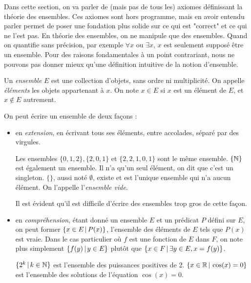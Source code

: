 Dans cette section, on va parler de (mais pas de tous les) axiomes définissant la théorie des ensembles. Ces axiomes sont hors programme, mais en avoir entendu parler permet de poser une fondation plus solide sur ce qui est "correct" et ce qui ne l'est pas. En théorie des ensembles, on ne manipule que des ensembles. Quand on quantifie sans précision, par exemple $\forall x$ ou $\exists x$, $x$ est seulement supposé être un ensemble.
Pour des raisons fondamentales à un point contrariant, nous ne pouvons pas donner mieux qu'une définition intuitive de la notion d'ensemble. 

\begin{dftn}
    Un \emph{ensemble} $E$ est une collection d'objets, sans ordre ni multiplicité. On  appelle \emph{éléments} les objets appartenant à $x$. On note $x \in E$ si $x$ est un élément de $E$, et $x \notin E$ autrement.
\end{dftn}


On peut écrire un ensemble de deux façons :
\begin{itemize}
    \item en \emph{extension}, en écrivant tous ses éléments, entre accolades, séparé par des virgules.
    \begin{lined}
        Les ensembles $\{0,1,2\}, \{2,0,1\}$ et $\{2,2,1,0,1\}$ sont le même ensemble. $\{\mathbb{N}\}$ est également un ensemble. Il n'a qu'un seul élément, on dit que c'est un singleton. $\{\}$, aussi noté $\emptyset$, existe et est l'unique ensemble qui n'a aucun élément. On l'appelle l'\emph{ensemble vide}.
    \end{lined}
    Il est évident qu'il est difficile d'écrire des ensembles trop gros de cette façon.
    \item en \emph{compréhension}, étant donné un ensemble $E$ et un prédicat $P$ défini sur $E$, on peut former $\{x \in E\,\vert\, P(x)\}$, l'ensemble des éléments de $E$ tels que $P(x)$ est vraie. Dans le cas particulier où $f$ est une fonction de $E$ dans $F$, on note plus simplement $\{f(y) \,\vert\, y \in E\}$ plutôt que $\{x \in F \,\vert\, \exists y \in E, x = f(y)\}$.
    \begin{lined}
        $\{2^k \,\vert\, k \in \mathbb{N}\}$ est l'ensemble des puissances positives de 2. $\{x \in \mathbb{R} \,\vert\, \cos(x) = 0\}$ est l'ensemble des solutions de l'équation $\cos(x) = 0$.
    \end{lined}
\end{itemize}

